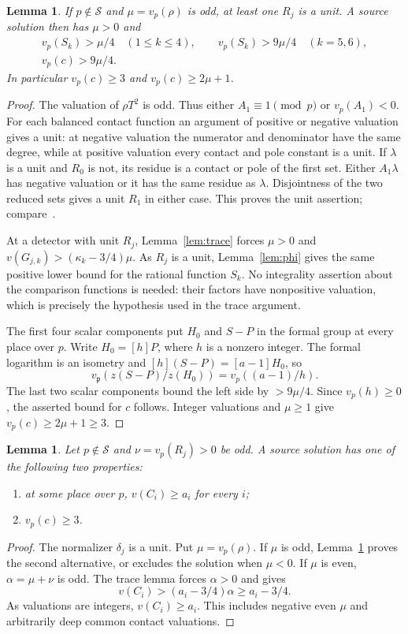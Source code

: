 \documentclass[11pt,a4paper]{article}
\newtheorem{lemma}[theorem]{Lemma}
\begin{document}
\begin{lemma}\label{lem:scalar-odd}
If $p\notin\mathcal S$ and $\mu=v_p(\rho)$ is odd, at least
one $R_j$ is a unit. A source solution then has $\mu>0$ and
\[
 \begin{gathered}
 v_p(S_k)>\mu/4\quad(1\le k\le4),\qquad
 v_p(S_k)>9\mu/4\quad(k=5,6),\\
 v_p(c)>9\mu/4.
 \end{gathered}
\]
In particular $v_p(c)\ge3$ and $v_p(c)\ge2\mu+1$.
\end{lemma}
\begin{proof}
The valuation of $\rho T^2$ is odd. Thus either $A_1\equiv1\pmod p$
or $v_p(A_1)<0$. For each balanced contact function an argument of
positive or negative valuation gives a unit: at negative valuation the
numerator and denominator have the same degree, while at positive
valuation every contact and pole constant is a unit. If $\lambda$
is a unit and $R_0$ is not, its residue is a contact or pole of the
first set. Either $A_1\lambda$ has negative valuation or it has
the same residue as $\lambda$. Disjointness of the two reduced
sets gives a unit $R_1$ in either case. This proves the unit
assertion; compare~\cite{LocalTests}.

At a detector with unit $R_j$, Lemma~\ref{lem:trace} forces
$\mu>0$ and $v(G_{j,k})>(\kappa_k-3/4)\mu$. As $R_j$ is a
unit, Lemma~\ref{lem:phi} gives the same positive lower bound
for the rational function $S_k$. No integrality assertion about the comparison
functions is needed: their factors have nonpositive valuation, which
is precisely the hypothesis used in the trace argument.

The first four scalar components put $H_0$ and $S-P$ in the formal
group at every place over $p$. Write $H_0=[h]P$, where $h$ is a
nonzero integer. The formal logarithm is an isometry and
$[h](S-P)=[a-1]H_0$, so
\[
 v_{\mathfrak p}(z(S-P)/z(H_0))=v_p((a-1)/h).
\]
The last two scalar components bound the left side by $>9\mu/4$.
Since $v_p(h)\ge0$, the asserted bound for $c$ follows. Integer
valuations and $\mu\ge1$ give $v_p(c)\ge2\mu+1\ge3$.
\end{proof}

\begin{lemma}\label{lem:mixed}
Let $p\notin\mathcal S$ and $\nu=v_p(R_j)>0$ be odd. A source
solution has one of the following two properties:
\begin{enumerate}
\item at some place over $p$, $v(C_i)\ge a_i$ for every $i$;
\item $v_p(c)\ge3$.
\end{enumerate}
\end{lemma}
\begin{proof}
The normalizer $\delta_j$ is a unit. Put $\mu=v_p(\rho)$.
If $\mu$ is odd, Lemma~\ref{lem:scalar-odd} proves the second
alternative, or excludes the solution when $\mu<0$.
If $\mu$ is even, $\alpha=\mu+\nu$ is odd. The trace lemma
forces $\alpha>0$ and gives
\[
 v(C_i)>(a_i-3/4)\alpha\ge a_i-3/4.
\]
As valuations are integers, $v(C_i)\ge a_i$. This includes
negative even $\mu$ and arbitrarily deep common contact valuations.
\end{proof}
\end{document}
